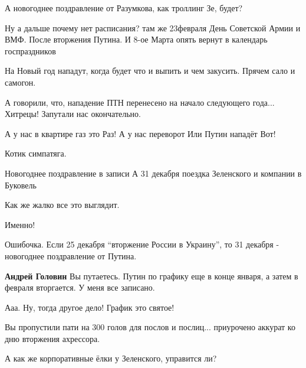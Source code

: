 \begin{itemize}
А новогоднее поздравление от Разумкова, как троллинг Зе, будет?


Ну а дальше почему нет расписания? там же 23февраля День Советской Армии и ВМФ.
После вторжения Путина. И 8-ое Марта опять вернут в календарь госпраздников


На Новый год нападут, когда будет что и выпить и чем закусить. Прячем сало и самогон.

А говорили, что, нападение ПТН перенесено на начало следующего года... Хитрецы! Запутали нас окончательно.

А у нас в квартире газ
это Раз!
А у нас переворот
Или Путин нападёт
Вот!

Котик симпатяга.

Новогоднее поздравление в записи
А 31 декабря поездка Зеленского и компании в Буковель

Как же жалко все это выглядит.

Именно!


Ошибочка. Если 25 декабря \enquote{вторжение России в Украину}, то 31 декабря -
новогоднее поздравление от Путина.

\begin{itemize} %
\textbf{Андрей Головин} Вы путаетесь. Путин по графику еще в конце января, а затем в февраля вторгается. У меня все записано.

Ааа. Ну, тогда другое дело! График это святое!
\end{itemize} %

Вы пропустили пати на 300 голов для послов и послиц... приурочено аккурат ко дню вторжения ахрессора.

А как же корпоративные ёлки у Зеленского, управится ли?

\end{itemize} %
